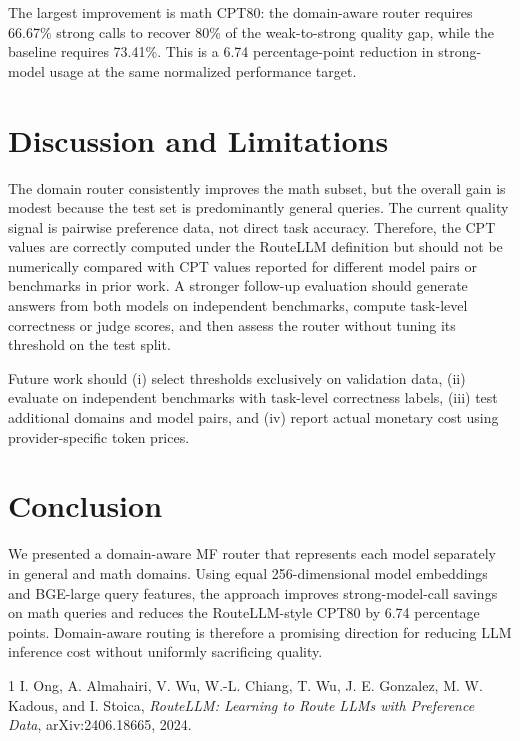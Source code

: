 \documentclass[conference]{IEEEtran}
\begin{document}
The largest improvement is math CPT80: the domain-aware router requires 66.67\% strong calls to recover 80\% of the weak-to-strong quality gap, while the baseline requires 73.41\%. This is a 6.74 percentage-point reduction in strong-model usage at the same normalized performance target.

\section{Discussion and Limitations}
The domain router consistently improves the math subset, but the overall gain is modest because the test set is predominantly general queries. The current quality signal is pairwise preference data, not direct task accuracy. Therefore, the CPT values are correctly computed under the RouteLLM definition but should not be numerically compared with CPT values reported for different model pairs or benchmarks in prior work. A stronger follow-up evaluation should generate answers from both models on independent benchmarks, compute task-level correctness or judge scores, and then assess the router without tuning its threshold on the test split.

Future work should (i) select thresholds exclusively on validation data, (ii) evaluate on independent benchmarks with task-level correctness labels, (iii) test additional domains and model pairs, and (iv) report actual monetary cost using provider-specific token prices.

\section{Conclusion}
We presented a domain-aware MF router that represents each model separately in general and math domains. Using equal 256-dimensional model embeddings and BGE-large query features, the approach improves strong-model-call savings on math queries and reduces the RouteLLM-style CPT80 by 6.74 percentage points. Domain-aware routing is therefore a promising direction for reducing LLM inference cost without uniformly sacrificing quality.

\begin{thebibliography}{1}
I. Ong, A. Almahairi, V. Wu, W.-L. Chiang, T. Wu, J. E. Gonzalez, M. W. Kadous, and I. Stoica, \emph{RouteLLM: Learning to Route LLMs with Preference Data}, arXiv:2406.18665, 2024.
\end{thebibliography}
\end{document}
